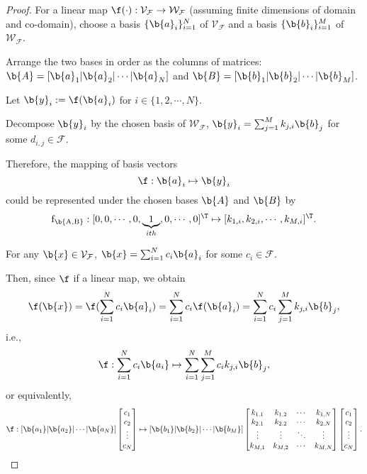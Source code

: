 \begin{proof} 
For a linear map $\f(\cdot): \mathcal{V}_{\mathcal{F}} \to \mathcal{W}_{\mathcal{F}}$  (assuming finite dimensions of domain and co-domain), choose a basis $\{\b{a}_i\}_{i=1}^N$ of $\mathcal{V}_{\mathcal{F}}$ and a basis $\{\b{b}_i\}_{i=1}^M$ of $\mathcal{W}_{\mathcal{F}}$. 

Arrange the two bases in order as the columns of matrices:
$\b{A} = \left[\b{a}_1 | \b{a}_2 | \cdots | \b{a}_N \right]$ and $\b{B} = [\b{b}_1 | \b{b}_2 | \cdots | \b{b}_M]$.

Let $\b{y}_i := \f(\b{a}_i)$ for $i \in \{1,2,\cdots,N\}$. 

Decompose $\b{y}_i$ by the chosen basis of $\mathcal{W}_{\mathcal{F}}$, $\b{y}_i =\sum_{j=1}^{M} k_{j,i}\b{b}_j$ for some $d_{i,j} \in \mathcal{F}$. 

Therefore, the mapping of basis vectors 
$$\f: \b{a}_i \mapsto \b{y}_i $$
could be represented under the chosen bases $\b{A}$ and $\b{B}$ 
by
$$\operatorname{f_{\b{A,B}}}: [0, 0, \cdots, 0, \underbrace{1}_{ith}, 0, \cdots, 0]^\T \mapsto [k_{1,i}, k_{2, i}, \cdots, k_{M, i}]^\T.$$


For any $\b{x} \in \mathcal{V}_{\mathcal{F}}$,  $\b{x} =\sum_{i=1}^{N} c_i\b{a}_i$ for some $c_i \in \mathcal{F}$.

Then, since $\f$ if a linear map, we obtain
$$\f(\b{x}) = \f(\sum_{i=1}^{N} c_i\b{a}_i) = \sum_{i=1}^{N} c_i \f(\b{a}_i) = \sum_{i=1}^{N} c_i \sum_{j=1}^{M} k_{j, i}\b{b}_j,$$
i.e.,
$$\f: \sum_{i=1}^{N} c_i\b{a_i} \mapsto \sum_{i=1}^{N} \sum_{j=1}^{M} c_i k_{j, i}\b{b}_j,$$
or equivalently,
$$\f:
\left[ \b{a_1} | \b{a_2}| \cdots |\b{a_N} \right]\begin{bmatrix}
c_1 \\
c_2 \\
\vdots \\
c_N
\end{bmatrix}
\mapsto 
\left[ \b{b_1} | \b{b_2}| \cdots |\b{b_M} \right]
\begin{bmatrix}
k_{1,1} &k_{1,2} &\cdots &k_{1,N} \\
k_{2,1} &k_{2,2} &\cdots &k_{2,N} \\
\vdots  &\vdots  &\ddots &\vdots  \\
k_{M,1} &k_{M,2} &\cdots &k_{M,N} 
\end{bmatrix}
\begin{bmatrix}
c_1 \\
c_2 \\
\vdots \\
c_N
\end{bmatrix}.
$$


\end{proof}
